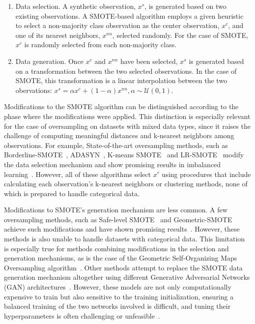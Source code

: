 \documentclass[parskip=full]{scrartcl}
\begin{document}
\begin{enumerate}
    \item Data selection. A synthetic observation, $x^s$, is generated based
        on two existing observations. A SMOTE-based algorithm employs a given
        heuristic to select a non-majority class observation as the center
        observation, $x^c$, and one of its nearest neighbors, $x^{nn}$,
        selected randomly. For the case of SMOTE, $x^c$ is randomly selected
        from each non-majority class.
    \item Data generation. Once $x^c$ and $x^{nn}$ have been selected, $x^s$
        is generated based on a transformation between the two selected
        observations. In the case of SMOTE, this transformation is 
        a linear interpolation between the two obervations: $x^s = \alpha x^c
        + (1-\alpha) x^{nn}, \alpha \sim \mathcal{U}(0, 1)$.
\end{enumerate}

Modifications to the SMOTE algorithm can be distinguished according to the
phase where the modifications were applied. This distinction is especially
relevant for the case of oversampling on datasets with mixed data types, since
it raises the challenge of computing meaningful distances and k-nearest
neighbors among observations. For example, State-of-the-art oversampling
methods, such as Borderline-SMOTE~\cite{han2005borderline},
ADASYN~\cite{he2008adasyn}, K-means SMOTE~\cite{douzas2018improving} and
LR-SMOTE~\cite{liang2020lr} modify the data selection mechanism and show
promising results in imbalanced learning~\cite{fonseca2021improving}. However,
all of these algorithms select $x^c$ using procedures that include calculating
each observation's k-nearest neighbors or clustering methods, none of which is
prepared to handle categorical data.

Modifications to SMOTE's generation mechanism are less common. A few
oversampling methods, such as Safe-level SMOTE~\cite{bunkhumpornpat2009safe}
and Geometric-SMOTE~\cite{douzas2019geometric} achieve such modifications and
have shown promising results~\cite{douzas2019imbalanced}. However, these
methods is also unable to handle datasets with categorical data. This
limitation is especially true for methods combining modifications in the
selection and generation mechanisms, as is the case of the Geometric
Self-Organizing Maps Oversampling algorithm~\cite{douzas2021g}. Other methods
attempt to replace the SMOTE data generation mechanism altogether using
different Generative Adversarial Networks (GAN)
architectures~\cite{salazar2021generative, koivu2020synthetic, jo2022obgan}.
However, these models are not only computationally expensive to train but also
sensitive to the training initialization, ensuring a balanced training of the
two networks involved is difficult, and tuning their hyperparameters is often
challenging or unfeasible~\cite{gonog2019review}. 
\end{document}
